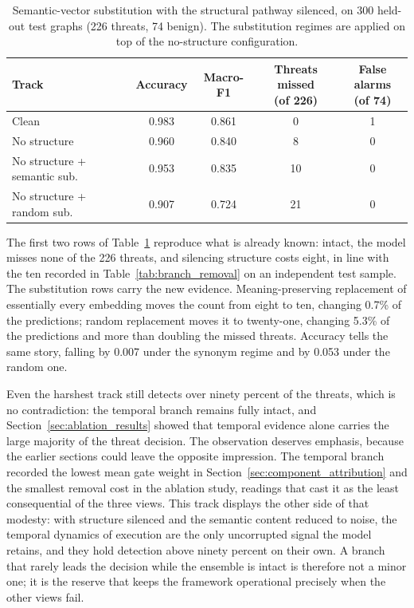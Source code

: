 \documentclass[%
    BCOR=10mm,
    DIV=13,
    toc=bibliography,
    toc=listof,
    oneside,
    12pt,
]{scrbook}
\begin{document}
\begin{table}[htbp]
\centering
\caption[Substitution under forced semantic reliance]{Semantic-vector
substitution with the structural pathway silenced, on 300 held-out test
graphs (226 threats, 74 benign). The substitution regimes are applied on top
of the no-structure configuration.}
\label{tab:semantic_sub_no_structure}
\small
\setlength{\tabcolsep}{4pt}
\begin{tabular}{l c c c c}
\toprule
Track & Accuracy & Macro-F1 & \makecell[c]{Threats missed\\(of 226)} &
\makecell[c]{False alarms\\(of 74)} \\
\midrule
Clean                        & 0.983 & 0.861 & 0  & 1 \\
No structure                 & 0.960 & 0.840 & 8  & 0 \\
No structure + semantic sub. & 0.953 & 0.835 & 10 & 0 \\
No structure + random sub.   & 0.907 & 0.724 & 21 & 0 \\
\bottomrule
\end{tabular}
\end{table}

The first two rows of Table~\ref{tab:semantic_sub_no_structure} reproduce
what is already known: intact, the model misses none of the 226 threats, and
silencing structure costs eight, in line with the ten recorded in
Table~\ref{tab:branch_removal} on an independent test sample. The
substitution rows carry the new evidence. Meaning-preserving replacement of
essentially every embedding moves the count from eight to ten, changing
0.7\% of the predictions; random replacement moves it to twenty-one,
changing 5.3\% of the predictions and more than doubling the missed threats.
Accuracy tells the same story, falling by 0.007 under the synonym regime and
by 0.053 under the random one.

Even the harshest track still detects over ninety percent of the
threats, which is no contradiction: the temporal branch remains fully intact, and
Section~\ref{sec:ablation_results} showed that temporal evidence alone
carries the large majority of the threat decision. The observation deserves
emphasis, because the earlier sections could leave the opposite impression.
The temporal branch recorded the lowest mean gate weight in
Section~\ref{sec:component_attribution} and the smallest removal cost in the
ablation study, readings that cast it as the least consequential of the
three views. This track displays the other side of that modesty: with
structure silenced and the semantic content reduced to noise, the temporal
dynamics of execution are the only uncorrupted signal the model retains, and
they hold detection above ninety percent on their own. A branch that rarely
leads the decision while the ensemble is intact is therefore not a minor
one; it is the reserve that keeps the framework operational precisely when
the other views fail.
\end{document}
